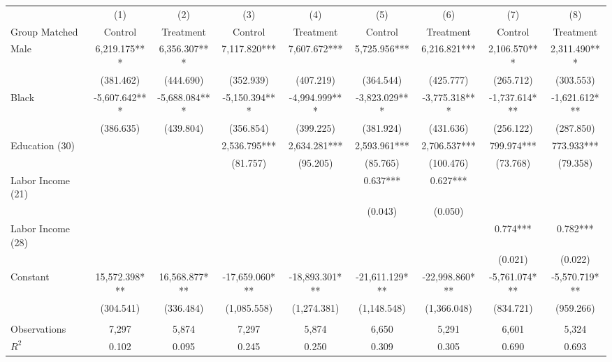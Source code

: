 \begin{tabular}{lcccccccc} \toprule
 & (1) & (2) & (3) & (4) & (5) & (6) & (7) & (8) \\
 Group Matched & Control & Treatment & Control & Treatment & Control & Treatment & Control & Treatment \\ \midrule
Male & 6,219.175*** & 6,356.307*** & 7,117.820*** & 7,607.672*** & 5,725.956*** & 6,216.821*** & 2,106.570*** & 2,311.490*** \\
 & (381.462) & (444.690) & (352.939) & (407.219) & (364.544) & (425.777) & (265.712) & (303.553) \\
Black & -5,607.642*** & -5,688.084*** & -5,150.394*** & -4,994.999*** & -3,823.029*** & -3,775.318*** & -1,737.614*** & -1,621.612*** \\
 & (386.635) & (439.804) & (356.854) & (399.225) & (381.924) & (431.636) & (256.122) & (287.850) \\
Education (30) &  &  & 2,536.795*** & 2,634.281*** & 2,593.961*** & 2,706.537*** & 799.974*** & 773.933*** \\
 &  &  & (81.757) & (95.205) & (85.765) & (100.476) & (73.768) & (79.358) \\
Labor Income (21) &  &  &  &  & 0.637*** & 0.627*** &  &  \\
 &  &  &  &  & (0.043) & (0.050) &  &  \\
Labor Income (28) &  &  &  &  &  &  & 0.774*** & 0.782*** \\
 &  &  &  &  &  &  & (0.021) & (0.022) \\
Constant & 15,572.398*** & 16,568.877*** & -17,659.060*** & -18,893.301*** & -21,611.129*** & -22,998.860*** & -5,761.074*** & -5,570.719*** \\
 & (304.541) & (336.484) & (1,085.558) & (1,274.381) & (1,148.548) & (1,366.048) & (834.721) & (959.266) \\ \\ \midrule Observations & 7,297 & 5,874 & 7,297 & 5,874 & 6,650 & 5,291 & 6,601 & 5,324 \\
$R^2$ & 0.102 & 0.095 & 0.245 & 0.250 & 0.309 & 0.305 & 0.690 & 0.693 \\ \hline
\end{tabular}
